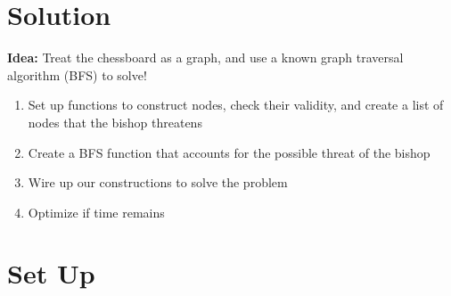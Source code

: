 \documentclass[11pt]{exam}
\begin{document}
\newpage
\section*{Solution}
\textbf{Idea:} Treat the chessboard as a graph, and use a known graph traversal algorithm (BFS) to solve!
\begin{enumerate}
	\item Set up functions to construct nodes, check their validity, and create a list of nodes that the bishop threatens
	\item Create a BFS function that accounts for the possible threat of the bishop
	\item Wire up our constructions to solve the problem
	\item Optimize if time remains
\end{enumerate}
\section*{Set Up}
\begin{algorithm}[H]
\begin{algorithmic}
\EndProcedure
{}
	\EndIf
\EndProcedure
{}
	\EndIf
\EndProcedure
{}
		\EndIf
		\EndIf
		\EndIf
		\EndIf
	\EndFor
\EndProcedure
\end{algorithmic}
\end{algorithm}
\end{document}
